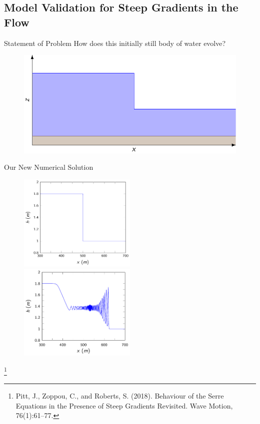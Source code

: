 \documentclass[handout]{beamer}
\newcommand\blfootnote[1]{%
	\begingroup
	\renewcommand\thefootnote{}\footnote{#1}%
	\addtocounter{footnote}{-1}%
	\endgroup
}
\begin{document}
\subsection{ Model Validation for Steep Gradients in the Flow}
\begin{frame}{Statement of Problem}
	How does this initially still body of water evolve?
	\begin{figure}
		\includegraphics[width=\textwidth]{./Pics/SteepGradients/Wavetank.pdf}
	\end{figure}
\end{frame}	

\begin{frame}{Our New Numerical Solution}
	\begin{figure}
		\includegraphics[width=0.5\textwidth]{./Pics/SteepGradients/DBinit.pdf}
		\includegraphics[width=0.5\textwidth]{./Pics/SteepGradients/DBfint.pdf}
	\end{figure}
	\blfootnote{Pitt, J., Zoppou, C., and Roberts, S. (2018).
		Behaviour of the Serre Equations in the Presence of Steep
		Gradients Revisited.
		Wave Motion, 76(1):61–77.}
\end{frame}
\end{document}
